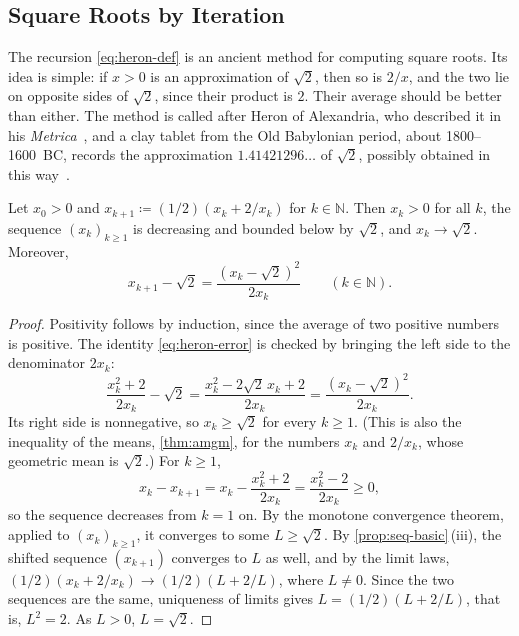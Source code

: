 \subsection{Square Roots by Iteration}

The recursion \eqref{eq:heron-def} is an ancient method for computing square roots. Its idea is simple: if $x>0$ is an approximation of $\sqrt2$, then so is $2/x$, and the two lie on opposite sides of $\sqrt2$, since their product is $2$. Their average should be better than either. The method is called  after Heron of Alexandria, who described it in his \emph{Metrica}~\cite{heath1921}, and a clay tablet from the Old Babylonian period, about 1800--1600~BC, records the approximation $1.41421296\ldots$ of $\sqrt2$, possibly obtained in this way~\cite{fowler1998}.

\begin{proposition}
\label{prop:heron}
Let $x_0>0$ and $x_{k+1}\coloneqq(1/2)(x_k+2/x_k)$ for $k\in\mathbb N$. Then $x_k>0$ for all $k$, the sequence $(x_k)_{k\ge1}$ is decreasing and bounded below by $\sqrt2$, and $x_k\to\sqrt2$. Moreover,
\begin{equation}
x_{k+1}-\sqrt2=\frac{(x_k-\sqrt2)^2}{2x_k}\qquad(k\in\mathbb N).
\label{eq:heron-error}
\end{equation}
\end{proposition}

\begin{proof}
Positivity follows by induction, since the average of two positive numbers is positive. The identity \eqref{eq:heron-error} is checked by bringing the left side to the denominator $2x_k$:
\[
\frac{x_k^2+2}{2x_k}-\sqrt2=\frac{x_k^2-2\sqrt2\,x_k+2}{2x_k}=\frac{(x_k-\sqrt2)^2}{2x_k} .
\]
Its right side is nonnegative, so $x_k\ge\sqrt2$ for every $k\ge1$. (This is also the inequality of the means, \cref{thm:amgm}, for the numbers $x_k$ and $2/x_k$, whose geometric mean is $\sqrt2$.) For $k\ge1$,
\[
x_k-x_{k+1}=x_k-\frac{x_k^2+2}{2x_k}=\frac{x_k^2-2}{2x_k}\ge0 ,
\]
so the sequence decreases from $k=1$ on. By the monotone convergence theorem, applied to $(x_k)_{k\ge1}$, it converges to some $L\ge\sqrt2$. By \cref{prop:seq-basic}\,(iii), the shifted sequence $(x_{k+1})$ converges to $L$ as well, and by the limit laws, $(1/2)(x_k+2/x_k)\to(1/2)(L+2/L)$, where $L\ne0$. Since the two sequences are the same, uniqueness of limits gives $L=(1/2)(L+2/L)$, that is, $L^2=2$. As $L>0$, $L=\sqrt2$.
\end{proof}

